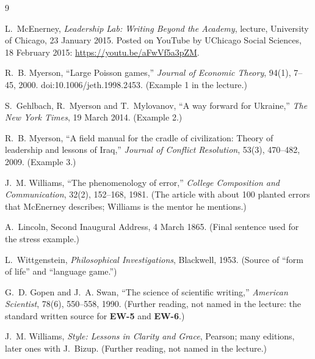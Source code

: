 \documentclass[11pt]{article}
\newcommand{\id}[1]{{\sffamily\bfseries\color{accent}#1}}              %
\begin{document}
{\small
\renewcommand{\section}[2]{}%
\begin{thebibliography}{9}\setlength{\itemsep}{0pt}\raggedright

L.~McEnerney, \emph{Leadership Lab: Writing Beyond the Academy}, lecture, University of Chicago,
23 January 2015. Posted on YouTube by UChicago Social Sciences, 18 February 2015:
{\url{https://youtu.be/aFwVf5a3pZM}}.

R.~B. Myerson, ``Large Poisson games,'' \emph{Journal of Economic Theory}, 94(1), 7--45, 2000.
doi:10.1006/jeth.1998.2453. (Example 1 in the lecture.)

S.~Gehlbach, R.~Myerson and T.~Mylovanov, ``A way forward for Ukraine,'' \emph{The New York Times},
19 March 2014. (Example 2.)

R.~B. Myerson, ``A field manual for the cradle of civilization: Theory of leadership and lessons of Iraq,''
\emph{Journal of Conflict Resolution}, 53(3), 470--482, 2009. (Example 3.)

J.~M. Williams, ``The phenomenology of error,'' \emph{College Composition and Communication}, 32(2),
152--168, 1981. (The article with about 100 planted errors that McEnerney describes; Williams is the
mentor he mentions.)

A.~Lincoln, Second Inaugural Address, 4 March 1865. (Final sentence used for the stress example.)

L.~Wittgenstein, \emph{Philosophical Investigations}, Blackwell, 1953. (Source of ``form of life'' and
``language game.'')

G.~D. Gopen and J.~A. Swan, ``The science of scientific writing,'' \emph{American Scientist}, 78(6), 550--558,
1990. (Further reading, not named in the lecture: the standard written source for \id{EW-5} and \id{EW-6}.)

J.~M. Williams, \emph{Style: Lessons in Clarity and Grace}, Pearson; many editions, later ones with J.~Bizup.
(Further reading, not named in the lecture.)

\end{thebibliography}

}
\end{document}
